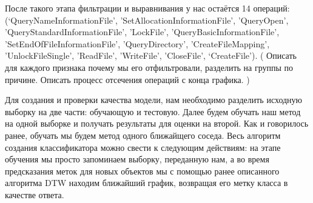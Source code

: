 После такого этапа фильтрации и выравнивания у нас остаётся 14 операций: (‘QueryNameInformationFile', 'SetAllocationInformationFile', 'QueryOpen', 'QueryStandardInformationFile', 'LockFile', 'QueryBasicInformationFile', 'SetEndOfFileInformationFile', 'QueryDirectory', 'CreateFileMapping', 'UnlockFileSingle', 'ReadFile', 'WriteFile', 'CloseFile', ‘CreateFile’). ( Описать для каждого признака почему мы его отфильтровали, разделить на группы по причине. Описать процесс отсечения операций с конца графика. )

Для создания и проверки качества модели, нам необходимо разделить исходную выборку на две части: обучающую и тестовую. Далее будем обучать наш метод на одной выборке и получать результаты для оценки на второй. Как и говорилось ранее, обучать мы будем метод одного ближайщего соседа. Весь алгоритм создания классификатора можно свести к следующим действиям: на этапе обучения мы просто запоминаем выборку, переданную нам, а во время предсказания меток для новых объектов мы с помощью ранее описанного алгоритма DTW находим ближайший график, возвращая его метку класса в качестве ответа.

